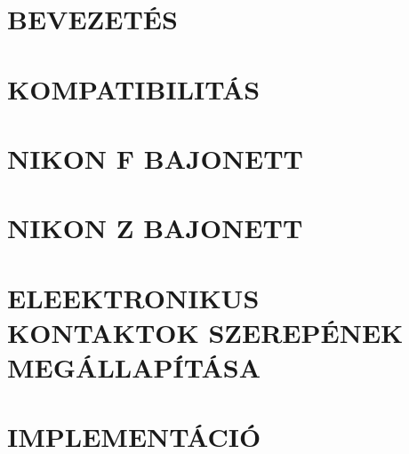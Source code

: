 








%
%
%
%


\newpage
\tableofcontents
\newpage





\clearpage
\section{BEVEZETÉS}

\clearpage
\section{KOMPATIBILITÁS}

\clearpage
\section{NIKON F BAJONETT}

\clearpage
\section{NIKON Z BAJONETT}

\clearpage
\section{ELEEKTRONIKUS KONTAKTOK SZEREPÉNEK MEGÁLLAPÍTÁSA}

\clearpage
\section{IMPLEMENTÁCIÓ}


%










